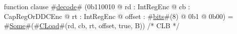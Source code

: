 function clause #\hyperref[sailMIPSzdecode]{decode}# (0b110010 @ rd : IntRegEnc @ cb : CapRegOrDDCEnc @ rt : IntRegEnc @ offset : #\hyperref[sailMIPSzbits]{bits}#(8) @ 0b1 @ 0b00) = #\hyperref[sailMIPSzSome]{Some}#(#\hyperref[sailMIPSzCLoad]{CLoad}#(rd, cb, rt, offset, true,  B)) /* CLB */
